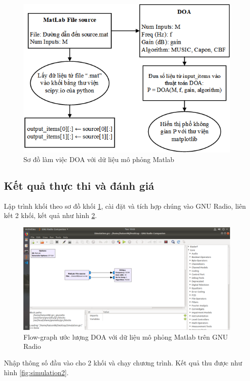 {\begin{figure} [h]
	\centering
	\includegraphics[width=0.9\linewidth]{figures/simulation.png}
	\caption{Sơ đồ làm việc DOA với dữ liệu mô phỏng Matlab}
	\label{fig:simulation}
\end{figure}

\subsection{Kết quả thực thi và đánh giá}

Lập trình khối theo sơ đồ khối \ref{fig:simulation}, cài đặt và tích hợp chúng vào GNU Radio, liên kết 2 khối, kết quả như hình \ref{fig:simulation1}.

\begin{figure} [!hb]
	\centering
	\includegraphics[width=1\linewidth]{figures/simulation1.png}
	\caption{Flow-graph ước lượng DOA với dữ liệu mô phỏng Matlab trên GNU Radio}
	\label{fig:simulation1}
\end{figure}

Nhập thông số đầu vào cho 2 khối và chạy chương trình. Kết quả thu được như hình \ref{fig:simulation2}.

}
